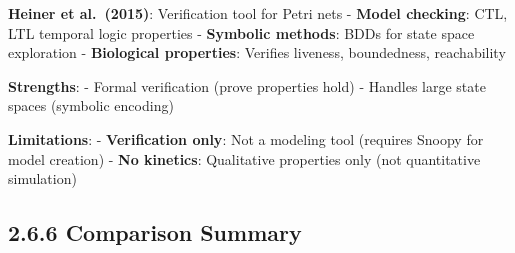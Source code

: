 \textbf{Heiner et al.~(2015)}: Verification tool for Petri nets -
\textbf{Model checking}: CTL, LTL temporal logic properties -
\textbf{Symbolic methods}: BDDs for state space exploration -
\textbf{Biological properties}: Verifies liveness, boundedness,
reachability

\textbf{Strengths}: - Formal verification (prove properties hold) -
Handles large state spaces (symbolic encoding)

\textbf{Limitations}: - \textbf{Verification only}: Not a modeling tool
(requires Snoopy for model creation) - \textbf{No kinetics}: Qualitative
properties only (not quantitative simulation)

\hypertarget{comparison-summary-1}{%
\subsection{2.6.6 Comparison Summary}\label{comparison-summary-1}}

